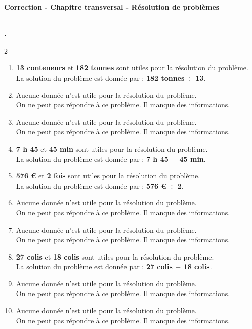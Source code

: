 \documentclass[10pt,a4paper]{article}
\newcounter{exo}
\newcommand{\exo}[1][]{%
  \refstepcounter{exo}%
  \textbf{\textcolor{Couleur8}{\\[0.3cm]\theexo.}}%
  \if\relax\detokenize{#1}\relax\else\ \textbf{#1}\fi\ %
}
\begin{document}
\newpage
\setcounter{exo}{0}
\begin{Large}\textbf{\textcolor{Couleur8}{Correction - Chapitre transversal - Résolution de problèmes}} \end{Large}

\exo
\vspace{-0.85cm}
\begin{multicols}{2}
\begin{enumerate}[itemsep=0.5em]
\item {\bfseries \color{Couleur10}13 conteneurs} et {\bfseries \color{Couleur10}182 tonnes} sont utiles pour la résolution du problème.\\La solution du problème est donnée par : {\bfseries \color{Couleur10}182 tonnes}$\,\div\,${\bfseries \color{Couleur10}13}.
\item Aucune donnée n'est utile pour la résolution du problème.\\On ne peut pas répondre à ce problème. Il manque des informations.
\item Aucune donnée n'est utile pour la résolution du problème.\\On ne peut pas répondre à ce problème. Il manque des informations.
\item {\bfseries \color{Couleur10}7 h 45} et {\bfseries \color{Couleur10}45 min} sont utiles pour la résolution du problème.\\La solution du problème est donnée par : {\bfseries \color{Couleur10}7 h 45}$\,+\,${\bfseries \color{Couleur10}45 min}.
\item {\bfseries \color{Couleur10}576 €} et {\bfseries \color{Couleur10}2 fois} sont utiles pour la résolution du problème.\\La solution du problème est donnée par : {\bfseries \color{Couleur10}576 €}$\,\div\,${\bfseries \color{Couleur10}2}.
\item Aucune donnée n'est utile pour la résolution du problème.\\On ne peut pas répondre à ce problème. Il manque des informations.
\item Aucune donnée n'est utile pour la résolution du problème.\\On ne peut pas répondre à ce problème. Il manque des informations.
\item {\bfseries \color{Couleur10}27 colis} et {\bfseries \color{Couleur10}18 colis} sont utiles pour la résolution du problème.\\La solution du problème est donnée par : {\bfseries \color{Couleur10}27 colis}$\,-\,${\bfseries \color{Couleur10}18 colis}.
\item Aucune donnée n'est utile pour la résolution du problème.\\On ne peut pas répondre à ce problème. Il manque des informations.
\item Aucune donnée n'est utile pour la résolution du problème.\\On ne peut pas répondre à ce problème. Il manque des informations.
\end{enumerate}
\end{multicols}
 
\end{document}
